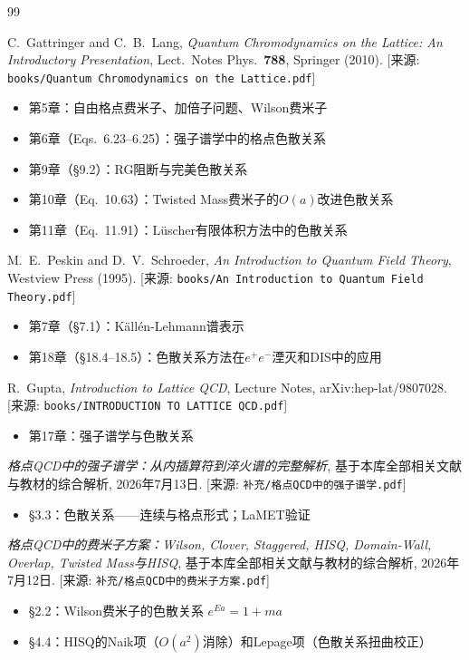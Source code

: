 \documentclass[12pt,a4paper]{ctexart}
\theoremstyle{definition}
\begin{document}
\begin{thebibliography}{99}

C.~Gattringer and C.~B.~Lang,
\textit{Quantum Chromodynamics on the Lattice: An Introductory Presentation},
Lect.\ Notes Phys.\ \textbf{788}, Springer (2010).
[来源: \texttt{books/Quantum Chromodynamics on the Lattice.pdf}]
\begin{itemize}
    \item 第5章：自由格点费米子、加倍子问题、Wilson费米子
    \item 第6章（Eqs.~6.23--6.25）：强子谱学中的格点色散关系
    \item 第9章（§9.2）：RG阻断与完美色散关系
    \item 第10章（Eq.~10.63）：Twisted Mass费米子的$O(a)$改进色散关系
    \item 第11章（Eq.~11.91）：L\"uscher有限体积方法中的色散关系
\end{itemize}

M.~E.~Peskin and D.~V.~Schroeder,
\textit{An Introduction to Quantum Field Theory},
Westview Press (1995).
[来源: \texttt{books/An Introduction to Quantum Field Theory.pdf}]
\begin{itemize}
    \item 第7章（§7.1）：K\"all\'en-Lehmann谱表示
    \item 第18章（§18.4--18.5）：色散关系方法在$e^+e^-$湮灭和DIS中的应用
\end{itemize}

R.~Gupta,
\textit{Introduction to Lattice QCD},
Lecture Notes, arXiv:hep-lat/9807028.
[来源: \texttt{books/INTRODUCTION TO LATTICE QCD.pdf}]
\begin{itemize}
    \item 第17章：强子谱学与色散关系
\end{itemize}

\textit{格点QCD中的强子谱学：从内插算符到淬火谱的完整解析},
基于本库全部相关文献与教材的综合解析, 2026年7月13日.
[来源: \texttt{补充/格点QCD中的强子谱学.pdf}]
\begin{itemize}
    \item §3.3：色散关系——连续与格点形式；LaMET验证
\end{itemize}

\textit{格点QCD中的费米子方案：Wilson, Clover, Staggered, HISQ, Domain-Wall, Overlap, Twisted Mass与HISQ},
基于本库全部相关文献与教材的综合解析, 2026年7月12日.
[来源: \texttt{补充/格点QCD中的费米子方案.pdf}]
\begin{itemize}
    \item §2.2：Wilson费米子的色散关系 $e^{Ea} = 1 + ma$
    \item §4.4：HISQ的Naik项（$O(a^2)$消除）和Lepage项（色散关系扭曲校正）
\end{itemize}


\end{thebibliography}
\end{document}
